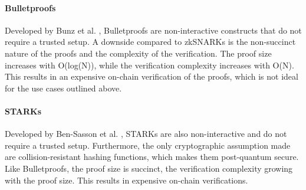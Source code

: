 \documentclass[../../thesis.tex]{subfiles}
\begin{document}
\paragraph{Bulletproofs}
Developed by Bunz et al. \cite{bunz2018bulletproofs}, Bulletproofs are non-interactive constructs that do not require a trusted setup. A downside compared to zkSNARKs is the non-succinct nature of the proofs and the complexity of the verification. The proof size increases with O(log(N)), while the verification complexity increases with O(N). This results in an expensive on-chain verification of the proofs, which is not ideal for the use cases outlined above.

\paragraph{STARKs}
Developed by Ben-Sasson et al. \cite{ben2018scalable}, STARKs are also non-interactive and do not require a trusted setup. Furthermore, the only cryptographic assumption made are collision-resistant hashing functions, which makes them post-quantum secure. Like Bulletproofs, the proof size is succinct, the verification complexity growing with the proof size. This results in expensive on-chain verifications.


\end{document}
